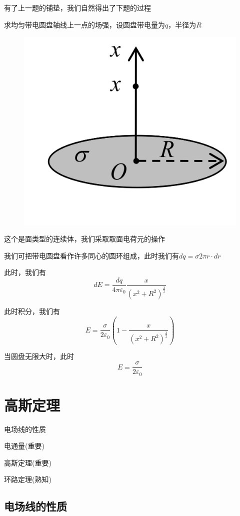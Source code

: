 \documentclass[lang=cn,10pt]{elegantbook}
\begin{document}
		有了上一题的铺垫，我们自然得出了下题的过程
		\begin{example}
			求均匀带电圆盘轴线上一点的场强，设圆盘带电量为$q$，半径为$R$
		\end{example}
		\begin{solution}
			\begin{figure}[H]
				\centering
				\includegraphics[width=0.3\linewidth]{image/IMG_0409(20231116-173758)}
				\caption{}
				\label{fig:img040920231116-173758}
			\end{figure}
			这个是面类型的连续体，我们采取取面电荷元的操作
			
			我们可把带电圆盘看作许多同心的圆环组成，此时我们有$dq=\sigma 2\pi r \cdot dr$
			

			此时，我们有
			\begin{equation*}
				dE=\frac{dq}{4\pi \varepsilon _0}\frac{x}{\left( x^2+R^2 \right) ^{\frac{3}{2}}}
			\end{equation*}
			
			此时积分，我们有
			\begin{equation*}
				E=\frac{\sigma}{2\varepsilon _0}\left( 1-\frac{x}{\left( x^2+R^2 \right) ^{\frac{3}{2}}} \right)
			\end{equation*}
		\end{solution}
		\begin{note}
			当圆盘无限大时，此时
			\begin{equation*}
			E=\frac{\sigma}{2\varepsilon _0}
			\end{equation*}
		\end{note}
		\section{高斯定理}
		\begin{introduction}
			\item 电场线的性质
			\item 电通量(重要)
			\item 高斯定理(重要)
			\item 环路定理(熟知)
		\end{introduction}
		\subsection{电场线的性质}
		
\end{document}
